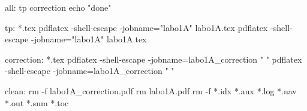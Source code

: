all: tp correction
	echo "done"


tp: *.tex
	pdflatex -shell-escape -jobname="labo1A" labo1A.tex
	pdflatex -shell-escape -jobname="labo1A" labo1A.tex


correction: *.tex
	pdflatex -shell-escape -jobname=labo1A_correction "\def\koriG{} "
	pdflatex -shell-escape -jobname=labo1A_correction "\def\koriG{} "

clean:
	rm -f labo1A_correction.pdf rm labo1A.pdf
	rm -f *.idx *.aux *.log *.nav *.out *.snm *.toc